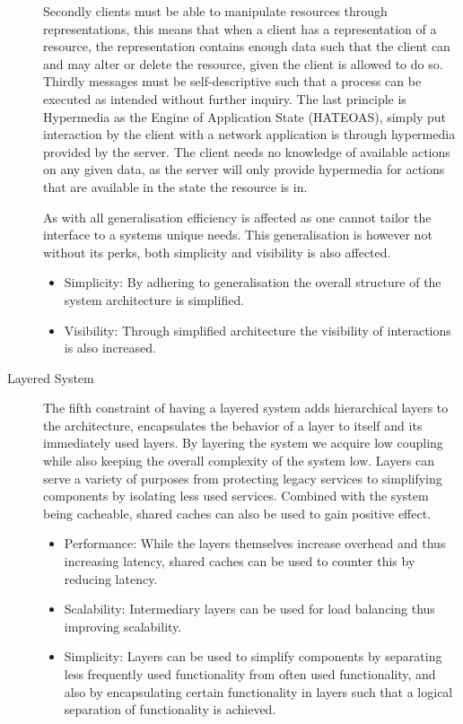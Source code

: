 \begin{description}
    Secondly clients must be able to manipulate resources through representations, this means that when a client has a representation of a resource, the representation contains enough data such that the client can and may alter or delete the resource, given the client is allowed to do so.
    Thirdly messages must be self-descriptive such that a process can be executed as intended without further inquiry.
    The last principle is Hypermedia as the Engine of Application State (HATEOAS), simply put interaction by the client with a network application is through hypermedia provided by the server.
    The client needs no knowledge of available actions on any given data, as the server will only provide hypermedia for actions that are available in the state the resource is in.

    As with all generalisation efficiency is affected as one cannot tailor the interface to a systems unique needs.
    This generalisation is however not without its perks, both simplicity and visibility is also affected.
    \begin{itemize}
        \item Simplicity: By adhering to generalisation the overall structure of the system architecture is simplified.
        \item Visibility: Through simplified architecture the visibility of interactions is also increased.
    \end{itemize}
    \item [Layered System] \label{layeredsystem}The fifth constraint of having a layered system adds hierarchical layers to the architecture, encapsulates the behavior of a layer to itself and its immediately used layers.
    By layering the system we acquire low coupling while also keeping the overall complexity of the system low.
    Layers can serve a variety of purposes from protecting legacy services to simplifying components by isolating less used services.
    Combined with the system being cacheable, shared caches can also be used to gain positive effect.
    \begin{itemize}
        \item Performance: While the layers themselves increase overhead and thus increasing latency, shared caches can be used to counter this by reducing latency.
        \item Scalability: Intermediary layers can be used for load balancing thus improving scalability.
        \item Simplicity: Layers can be used to simplify components by separating less frequently used functionality from often used functionality, and also by encapsulating certain functionality in layers such that a logical separation of functionality is achieved.

\end{itemize}
\end{description}
